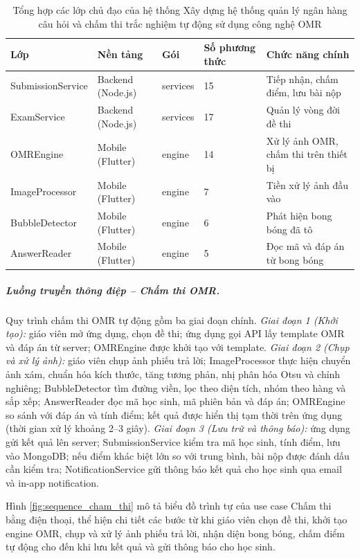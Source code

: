﻿\documentclass[../DoAn.tex]{subfiles}
\begin{document}
\begin{table}[H]
\centering
\begin{tabular}{|p{3cm}|p{2.5cm}|p{2.5cm}|p{2cm}|p{4.5cm}|}
\hline
\textbf{Lớp} & \textbf{Nền tảng} & \textbf{Gói} & \textbf{Số phương thức} & \textbf{Chức năng chính} \\ \hline
SubmissionService & Backend (Node.js) & services & 15 & Tiếp nhận, chấm điểm, lưu bài nộp \\ \hline
ExamService & Backend (Node.js) & services & 17 & Quản lý vòng đời đề thi \\ \hline
OMREngine & Mobile (Flutter) & engine & 14 & Xử lý ảnh OMR, chấm thi trên thiết bị \\ \hline
ImageProcessor & Mobile (Flutter) & engine & 7 & Tiền xử lý ảnh đầu vào \\ \hline
BubbleDetector & Mobile (Flutter) & engine & 6 & Phát hiện bong bóng đã tô \\ \hline
AnswerReader & Mobile (Flutter) & engine & 5 & Đọc mã và đáp án từ bong bóng \\ \hline
\end{tabular}
\caption{Tổng hợp các lớp chủ đạo của hệ thống Xây dựng hệ thống quản lý ngân hàng câu hỏi và chấm thi trắc nghiệm tự động sử dụng công nghệ OMR}
\label{table:class_summary}
\end{table}

\subparagraph{Luồng truyền thông điệp -- Chấm thi OMR.} Quy trình chấm thi OMR tự động gồm ba giai đoạn chính. \textit{Giai đoạn 1 (Khởi tạo):} giáo viên mở ứng dụng, chọn đề thi; ứng dụng gọi API lấy template OMR và đáp án từ server; OMREngine được khởi tạo với template. \textit{Giai đoạn 2 (Chụp và xử lý ảnh):} giáo viên chụp ảnh phiếu trả lời; ImageProcessor thực hiện chuyển ảnh xám, chuẩn hóa kích thước, tăng tương phản, nhị phân hóa Otsu và chỉnh nghiêng; BubbleDetector tìm đường viền, lọc theo diện tích, nhóm theo hàng và sắp xếp; AnswerReader đọc mã học sinh, mã phiên bản và đáp án; OMREngine so sánh với đáp án và tính điểm; kết quả được hiển thị tạm thời trên ứng dụng (thời gian xử lý khoảng 2--3 giây). \textit{Giai đoạn 3 (Lưu trữ và thông báo):} ứng dụng gửi kết quả lên server; SubmissionService kiểm tra mã học sinh, tính điểm, lưu vào MongoDB; nếu điểm khác biệt lớn so với trung bình, bài nộp được đánh dấu cần kiểm tra; NotificationService gửi thông báo kết quả cho học sinh qua email và in-app notification.

Hình \ref{fig:sequence_cham_thi} mô tả biểu đồ trình tự của use case Chấm thi bằng điện thoại, thể hiện chi tiết các bước từ khi giáo viên chọn đề thi, khởi tạo engine OMR, chụp và xử lý ảnh phiếu trả lời, nhận diện bong bóng, chấm điểm tự động cho đến khi lưu kết quả và gửi thông báo cho học sinh.
\end{document}
